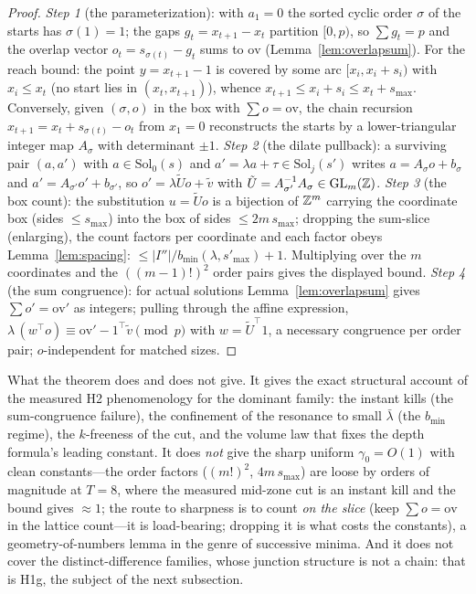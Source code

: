 \begin{proof}
\emph{Step 1} (the parameterization): with $a_1=0$ the sorted cyclic
order $\sigma$ of the starts has $\sigma(1)=1$; the gaps
$g_t=x_{t+1}-x_t$ partition $[0,p)$, so $\sum g_t=p$ and the overlap
vector $o_t=s_{\sigma(t)}-g_t$ sums to $\mathrm{ov}$
(Lemma~\ref{lem:overlapsum}). For the reach bound: the point
$y=x_{t+1}-1$ is covered by some arc $[x_i,x_i+s_i)$ with
$x_i\le x_t$ (no start lies in $(x_t,x_{t+1})$), whence
$x_{t+1}\le x_i+s_i\le x_t+s_{\max}$. Conversely, given $(\sigma,o)$ in
the box with $\sum o=\mathrm{ov}$, the chain recursion
$x_{t+1}=x_t+s_{\sigma(t)}-o_t$ from $x_1=0$ reconstructs the starts
by a lower-triangular integer map $A_\sigma$ with determinant $\pm1$.
\emph{Step 2} (the dilate pullback): a surviving pair
$(a,a')$ with $a\in\mathrm{Sol}_0(s)$ and
$a'=\lambda a+\tau\in\mathrm{Sol}_j(s')$ writes
$a=A_\sigma o+b_\sigma$ and $a'=A_{\sigma'}o'+b_{\sigma'}$, so
$o'=\lambda\tilde U o+\tilde v$ with $\tilde U=A_{\sigma'}^{-1}A_\sigma
\in\mathrm{GL}_m(\mathbb{Z})$.
\emph{Step 3} (the box count): the substitution $u=\tilde Uo$ is a
bijection of $\mathbb{Z}^m$ carrying the coordinate box (sides $\le s_{\max}$)
into the box of sides $\le 2m\,s_{\max}$; dropping the sum-slice
(enlarging), the count factors per coordinate and each factor obeys
Lemma~\ref{lem:spacing}: $\le|I''|/b_{\min}(\lambda,s'_{\max})+1$.
Multiplying over the $m$ coordinates and the $((m-1)!)^2$ order pairs
gives the displayed bound.
\emph{Step 4} (the sum congruence): for actual solutions
Lemma~\ref{lem:overlapsum} gives $\sum o'=\mathrm{ov}'$ as integers;
pulling through the affine expression,
$\lambda\,(w^\top o)\equiv\mathrm{ov}'-1^\top\tilde v\pmod p$ with
$w=\tilde U^\top 1$, a necessary congruence per order pair;
$o$-independent for matched sizes.
\end{proof}

What the theorem does and does not give. It gives the exact structural
account of the measured H2 phenomenology for the dominant family: the
instant kills (the sum-congruence failure), the confinement of the
resonance to small $\bar\lambda$ (the $b_{\min}$ regime), the
$k$-freeness of the cut, and the volume law that fixes the depth
formula's leading constant. It does \emph{not} give the sharp uniform
$\gamma_0=O(1)$ with clean constants---the order factors
($(m!)^2$, $4m\,s_{\max}$) are loose by orders of magnitude at $T=8$,
where the measured mid-zone cut is an instant kill and the bound gives
$\approx1$; the route to sharpness is to count \emph{on the slice}
(keep $\sum o=\mathrm{ov}$ in the lattice count---it is load-bearing;
dropping it is what costs the constants), a geometry-of-numbers lemma
in the genre of successive minima. And it does not cover the
distinct-difference families, whose junction structure is not a chain:
that is H1g, the subject of the next subsection.

